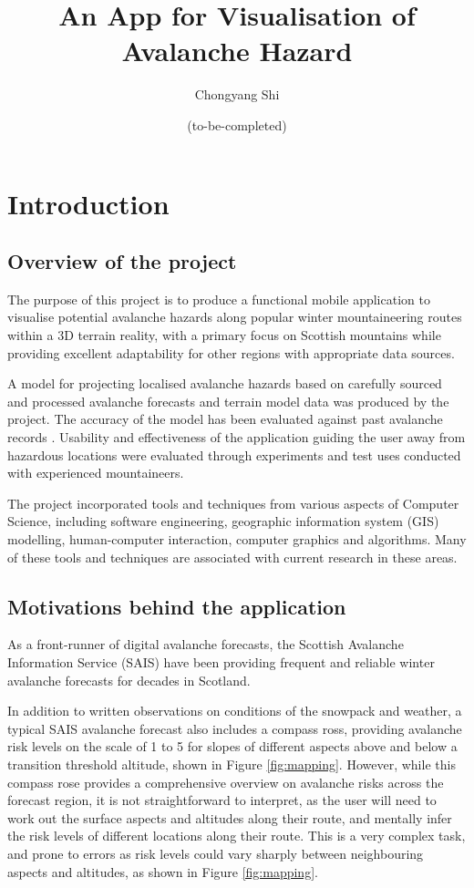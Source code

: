 \documentclass[openany]{UoYCSproject}
\title{An App for Visualisation of Avalanche Hazard}
\author{Chongyang Shi}
\date{(to-be-completed)}
\begin{document}
{\let\cleardoublepage\clearpage 
    \maketitle
}

\chapter{Introduction}

\section{Overview of the project}

The purpose of this project is to produce a functional mobile application to visualise potential avalanche hazards along popular winter mountaineering routes within a 3D terrain reality, with a primary focus on Scottish mountains while providing excellent adaptability for other regions with appropriate data sources. 

A model for projecting localised avalanche hazards based on carefully sourced and processed avalanche forecasts \cite{sais} and terrain model data \cite{os-5} was produced by the project. The accuracy of the model has been evaluated against past avalanche records \cite[pp. 143-151]{scottish-avalanches}\cite{sais-map}. Usability and effectiveness of the application guiding the user away from hazardous locations were evaluated through experiments and test uses conducted with experienced mountaineers.

The project incorporated tools and techniques from various aspects of Computer Science, including software engineering, geographic information system (GIS) modelling, human-computer interaction, computer graphics and algorithms. Many of these tools and techniques are associated with current research in these areas.

\section{Motivations behind the application}

As a front-runner of digital avalanche forecasts, the Scottish Avalanche Information Service (SAIS) \cite{sais} have been providing frequent and reliable winter avalanche forecasts for decades in Scotland.

In addition to written observations on conditions of the snowpack and weather, a typical SAIS avalanche forecast also includes a compass ross, providing avalanche risk levels on the scale of 1 to 5 for slopes of different aspects above and below a transition threshold altitude, shown in Figure \ref{fig:mapping}. However, while this compass rose provides a comprehensive overview on avalanche risks across the forecast region, it is not straightforward to interpret, as the user will need to work out the surface aspects and altitudes along their route, and mentally infer the risk levels of different locations along their route. This is a very complex task, and prone to errors as risk levels could vary sharply between neighbouring aspects and altitudes, as shown in Figure \ref{fig:mapping}.
\end{document}
